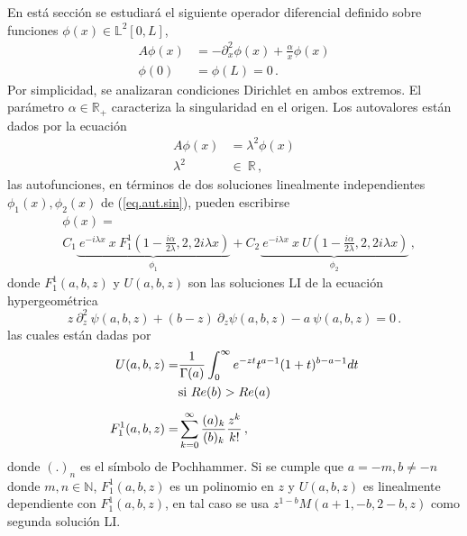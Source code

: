 En está sección se estudiará el siguiente operador diferencial definido sobre funciones $\phi (x)\in \mathbb{L} ^2 [0,L]$,
\begin{equation}
\begin{aligned}
    A \phi (x) &= - \partial ^2 _x  \phi(x) + \frac{\alpha}{x} \phi(x) \\[5pt]
    \phi(0) &= \phi(L) = 0 \, .
\end{aligned}
\label{operador}
\end{equation}
Por simplicidad, se analizaran condiciones Dirichlet en ambos extremos.  El parámetro $\alpha \in \mathbb{R _{+}}$ caracteriza la singularidad en el origen.
Los autovalores están dados por la ecuación 
\begin{equation}
\begin{aligned}
    A  \phi (x)  &=   \lambda ^2 \phi (x) \\[5pt]
    \lambda ^2 \ &\in \ \mathbb{R}  
    \, ,
\end{aligned}
\label{eq.aut.sin}
\end{equation}
las autofunciones, en términos de dos soluciones linealmente independientes $\phi _1 (x), \phi _2 (x)$ de (\ref{eq.aut.sin}), pueden escribirse
\begin{align}
\label{eq.phi}
&
    \phi (x) =
\\
&
	    C _1
    	\underbrace{
				     \ e ^{-i \lambda x} \ x \ 
				     F _{1} ^{1} 
				     		\left(  
				     			1 - \frac{i \alpha}
				     			{2\lambda}
				     		,2,2 i \lambda x \right) 
				     } _ {\phi_1} + 
      C _2 
      \underbrace{ 
      			   \ e^{-i \lambda x } \ x \ 
      			   U 
      			   	\left( 
      			   		1- \frac{i \alpha}{2 \lambda}
      			   		,2,2 i \lambda x \right) } _{\phi_2} 
    \, ,
\nonumber
\end{align}
donde $F _1 ^1(a,b,z)$ y $ U(a,b,z)$ son las soluciones LI de la ecuación {\mbox{hypergeométrica} }
\begin{equation}
    z \ \partial ^2 _z \ \psi (a,b,z) + (b-z) \
    \partial _z \psi (a,b,z)
    -a \ \psi (a,b,z) = 0 \, .
\end{equation}
las cuales están dadas por \cite{Abramowitz:hyper}
\begin{align}
	U(a,b,z) = &\frac{1}{\Gamma (a)} 
	\int _0 ^{\infty} e ^{-zt}
	t ^{a-1}
	(1+t) ^{b-a-1}
	dt \\
	& {\rm si \ } Re (b) > Re(a) 
	\nonumber
	\\[5pt]
	F _1 ^1 (a,b,z) =& \sum _ {k=0} ^{\infty} 
	\frac{(a) _k}{(b) _k} 
	\frac{z ^k}{k!} 
	\, ,
\end{align}
donde $(.) _n$ es el símbolo de Pochhammer.
Si se cumple que  $a=-m,b \neq -n$ donde $ m,n \in \mathbb{N}$, $F _1 ^1 (a,b,z)$ es un polinomio en $z$ y $U(a,b,z)$ es linealmente dependiente con $F _1 ^1 (a,b,z)$, en tal caso se usa $z^{1-b} M(a+1,-b,2-b,z)$ como segunda solución LI.


